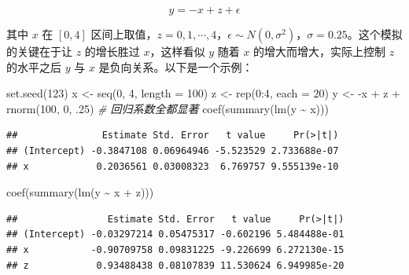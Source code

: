 \documentclass[
  b5paper,
  UTF8,twoside]{book}
\newenvironment{Shaded}{\begin{snugshade}}{\end{snugshade}}
\newcommand{\AttributeTok}[1]{\textcolor[rgb]{0.77,0.63,0.00}{#1}}
\newcommand{\CommentTok}[1]{\textcolor[rgb]{0.56,0.35,0.01}{\textit{#1}}}
\newcommand{\DecValTok}[1]{\textcolor[rgb]{0.00,0.00,0.81}{#1}}
\newcommand{\FunctionTok}[1]{\textcolor[rgb]{0.00,0.00,0.00}{#1}}
\newcommand{\NormalTok}[1]{#1}
\newcommand{\OtherTok}[1]{\textcolor[rgb]{0.56,0.35,0.01}{#1}}
\newcommand{\SpecialCharTok}[1]{\textcolor[rgb]{0.00,0.00,0.00}{#1}}
\begin{document}
\[y=-x+z+\epsilon\]

其中 \(x\) 在 \([0,4]\) 区间上取值，\(z=0,1,\cdots,4\)，\(\epsilon\sim N(0,\sigma^{2})\)，\(\sigma=0.25\)。这个模拟的关键在于让 \(z\) 的增长胜过 \(x\)，这样看似 \(y\) 随着 \(x\) 的增大而增大，实际上控制 \(z\) 的水平之后 \(y\) 与 \(x\) 是负向关系。以下是一个示例：

\begin{Shaded}
\begin{Highlighting}[]
\FunctionTok{set.seed}\NormalTok{(}\DecValTok{123}\NormalTok{)}
\NormalTok{x }\OtherTok{\textless{}{-}} \FunctionTok{seq}\NormalTok{(}\DecValTok{0}\NormalTok{, }\DecValTok{4}\NormalTok{, }\AttributeTok{length =} \DecValTok{100}\NormalTok{)}
\NormalTok{z }\OtherTok{\textless{}{-}} \FunctionTok{rep}\NormalTok{(}\DecValTok{0}\SpecialCharTok{:}\DecValTok{4}\NormalTok{, }\AttributeTok{each =} \DecValTok{20}\NormalTok{)}
\NormalTok{y }\OtherTok{\textless{}{-}} \SpecialCharTok{{-}}\NormalTok{x }\SpecialCharTok{+}\NormalTok{ z }\SpecialCharTok{+} \FunctionTok{rnorm}\NormalTok{(}\DecValTok{100}\NormalTok{, }\DecValTok{0}\NormalTok{, .}\DecValTok{25}\NormalTok{)}
\CommentTok{\# 回归系数全都显著}
\FunctionTok{coef}\NormalTok{(}\FunctionTok{summary}\NormalTok{(}\FunctionTok{lm}\NormalTok{(y }\SpecialCharTok{\textasciitilde{}}\NormalTok{ x)))}
\end{Highlighting}
\end{Shaded}

\begin{verbatim}
##               Estimate Std. Error   t value     Pr(>|t|)
## (Intercept) -0.3847108 0.06964946 -5.523529 2.733688e-07
## x            0.2036561 0.03008323  6.769757 9.555139e-10
\end{verbatim}

\begin{Shaded}
\begin{Highlighting}[]
\FunctionTok{coef}\NormalTok{(}\FunctionTok{summary}\NormalTok{(}\FunctionTok{lm}\NormalTok{(y }\SpecialCharTok{\textasciitilde{}}\NormalTok{ x }\SpecialCharTok{+}\NormalTok{ z)))}
\end{Highlighting}
\end{Shaded}

\begin{verbatim}
##                Estimate Std. Error   t value     Pr(>|t|)
## (Intercept) -0.03297214 0.05475317 -0.602196 5.484488e-01
## x           -0.90709758 0.09831225 -9.226699 6.272130e-15
## z            0.93488438 0.08107839 11.530624 6.949985e-20
\end{verbatim}
\end{document}
